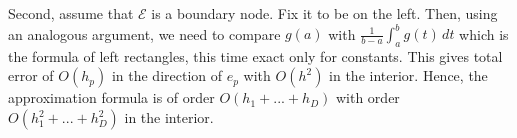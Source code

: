\begin{remark}
  Second, assume that $\mathcal{E}$ is a boundary node.
  Fix it to be on the left.
  Then, using an analogous argument, we need to compare
  $g(a)$ with $\frac{1}{b - a} \int_a^b g(t)\, dt$
  which is the formula of left rectangles, this time exact only for constants.
  This gives total error of $O(h_p)$ in the direction of $e_p$ with $O(h^2)$ in
  the interior.
  Hence, the approximation formula is of order $O(h_1 + ... + h_D)$ with order
  $O(h_1^2 + ... + h_D^2)$ in the interior.
\end{remark}
